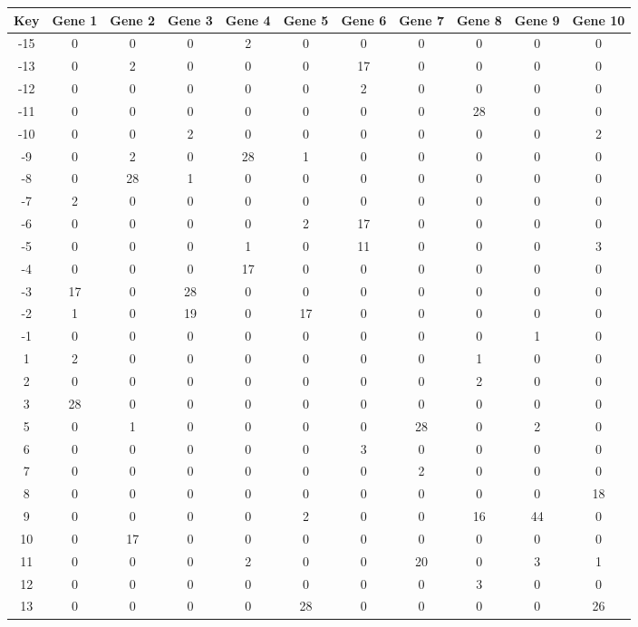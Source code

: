 \begin{tabular}{|c|c|c|c|c|c|c|c|c|c|c|}
\hline
Key & Gene 1 & Gene 2 & Gene 3 & Gene 4 & Gene 5 & Gene 6 & Gene 7 & Gene 8 & Gene 9 & Gene 10 \\
\hline
-15 & 0 & 0 & 0 & 2 & 0 & 0 & 0 & 0 & 0 & 0 \\
-13 & 0 & 2 & 0 & 0 & 0 & 17 & 0 & 0 & 0 & 0 \\
-12 & 0 & 0 & 0 & 0 & 0 & 2 & 0 & 0 & 0 & 0 \\
-11 & 0 & 0 & 0 & 0 & 0 & 0 & 0 & 28 & 0 & 0 \\
-10 & 0 & 0 & 2 & 0 & 0 & 0 & 0 & 0 & 0 & 2 \\
-9 & 0 & 2 & 0 & 28 & 1 & 0 & 0 & 0 & 0 & 0 \\
-8 & 0 & 28 & 1 & 0 & 0 & 0 & 0 & 0 & 0 & 0 \\
-7 & 2 & 0 & 0 & 0 & 0 & 0 & 0 & 0 & 0 & 0 \\
-6 & 0 & 0 & 0 & 0 & 2 & 17 & 0 & 0 & 0 & 0 \\
-5 & 0 & 0 & 0 & 1 & 0 & 11 & 0 & 0 & 0 & 3 \\
-4 & 0 & 0 & 0 & 17 & 0 & 0 & 0 & 0 & 0 & 0 \\
-3 & 17 & 0 & 28 & 0 & 0 & 0 & 0 & 0 & 0 & 0 \\
-2 & 1 & 0 & 19 & 0 & 17 & 0 & 0 & 0 & 0 & 0 \\
-1 & 0 & 0 & 0 & 0 & 0 & 0 & 0 & 0 & 1 & 0 \\
1 & 2 & 0 & 0 & 0 & 0 & 0 & 0 & 1 & 0 & 0 \\
2 & 0 & 0 & 0 & 0 & 0 & 0 & 0 & 2 & 0 & 0 \\
3 & 28 & 0 & 0 & 0 & 0 & 0 & 0 & 0 & 0 & 0 \\
5 & 0 & 1 & 0 & 0 & 0 & 0 & 28 & 0 & 2 & 0 \\
6 & 0 & 0 & 0 & 0 & 0 & 3 & 0 & 0 & 0 & 0 \\
7 & 0 & 0 & 0 & 0 & 0 & 0 & 2 & 0 & 0 & 0 \\
8 & 0 & 0 & 0 & 0 & 0 & 0 & 0 & 0 & 0 & 18 \\
9 & 0 & 0 & 0 & 0 & 2 & 0 & 0 & 16 & 44 & 0 \\
10 & 0 & 17 & 0 & 0 & 0 & 0 & 0 & 0 & 0 & 0 \\
11 & 0 & 0 & 0 & 2 & 0 & 0 & 20 & 0 & 3 & 1 \\
12 & 0 & 0 & 0 & 0 & 0 & 0 & 0 & 3 & 0 & 0 \\
13 & 0 & 0 & 0 & 0 & 28 & 0 & 0 & 0 & 0 & 26 \\
\hline
\end{tabular}